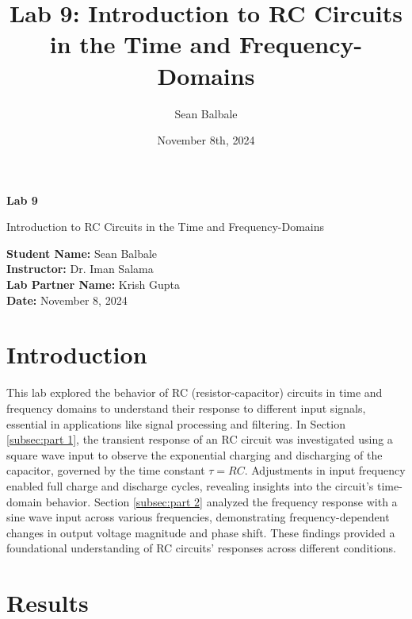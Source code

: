 \documentclass[12pt]{article}
\title{Lab 9: Introduction to RC Circuits in the Time and Frequency-Domains}
\author{Sean Balbale}
\date{November 8th, 2024}
\begin{document}
\begin{titlepage}
	\begin{center}
		\vspace*{1in}

		\Huge
		\textbf{Lab 9}

		\LARGE
		Introduction to RC Circuits in the Time and Frequency-Domains

		\vspace{3 in}

		\textbf{Student Name:} Sean Balbale
		\\ \textbf{Instructor:} Dr. Iman Salama
		\\ \textbf{Lab Partner Name:} Krish Gupta
		\\ \textbf{Date:} November 8, 2024

		\vfill


	\end{center}
\end{titlepage}

\newpage

\section{Introduction} 
This lab explored the behavior of RC (resistor-capacitor) circuits in 
time and frequency domains to understand their response to different 
input signals, essential in applications like signal processing and 
filtering. In Section \ref{subsec:part 1}, the transient response of 
an RC circuit was 
investigated using a square wave input to observe the exponential 
charging and discharging of the capacitor, governed by the time 
constant \(\tau = RC\). Adjustments in input frequency enabled full 
charge and discharge cycles, revealing insights into the circuit's 
time-domain behavior. Section \ref{subsec:part 2} analyzed the frequency 
response with a 
sine wave input across various frequencies, demonstrating 
frequency-dependent changes in output voltage magnitude and phase 
shift. These findings provided a foundational understanding of 
RC circuits’ responses across different conditions.


\section{Results}
\end{document}
